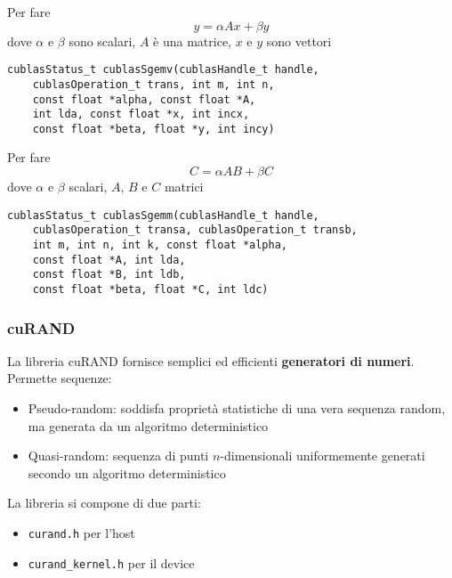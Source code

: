 Per fare 
$$ y = \alpha Ax + \beta y$$
dove $\alpha$ e $\beta$ sono scalari, $A$ è una matrice, $x$ e $y$ sono vettori
\begin{verbatim}
cublasStatus_t cublasSgemv(cublasHandle_t handle, 
	cublasOperation_t trans, int m, int n, 
	const float *alpha, const float *A, 
	int lda, const float *x, int incx, 
	const float *beta, float *y, int incy)
\end{verbatim}

Per fare
$$ C = \alpha AB + \beta C$$
dove $\alpha$ e $\beta$ scalari, $A$, $B$ e $C$ matrici
\begin{verbatim}
cublasStatus_t cublasSgemm(cublasHandle_t handle,
	cublasOperation_t transa, cublasOperation_t transb,
	int m, int n, int k, const float *alpha,
	const float *A, int lda,
	const float *B, int ldb,
	const float *beta, float *C, int ldc)
\end{verbatim}

\subsubsection{cuRAND}

La libreria cuRAND fornisce semplici ed efficienti \textbf{generatori di numeri}. Permette sequenze: 
\begin{itemize}
	\item Pseudo-random: soddisfa proprietà statistiche di una vera sequenza random, ma generata da un algoritmo deterministico
	
	\item Quasi-random: sequenza di punti $n$-dimensionali uniformemente generati secondo un algoritmo deterministico
\end{itemize}

La libreria si compone di due parti:
\begin{itemize}
	\item \texttt{curand.h} per l'host
	
	\item \texttt{curand\_kernel.h} per il device
\end{itemize}

